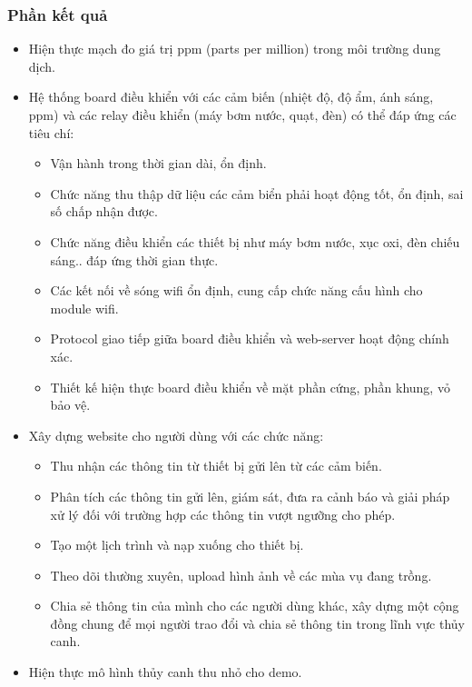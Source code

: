 \documentclass[a4paper,12pt,oneside]{article}
\begin{document}
\subsubsection{Phần kết quả}

\begin{itemize}
\item Hiện thực mạch đo giá trị ppm (parts per million) trong môi trường dung dịch.
\item Hệ thống board điều khiển với các cảm biến (nhiệt độ, độ ẩm, ánh sáng, ppm) và các relay điều khiển (máy bơm nước, quạt, đèn) có thể đáp ứng các tiêu chí:
	\begin{itemize}
		\item Vận hành trong thời gian dài, ổn định.
		\item Chức năng thu thập dữ liệu các cảm biển phải hoạt động tốt, ổn định, sai số chấp nhận được.
		\item Chức năng điều khiển các thiết bị như máy bơm nước, xục oxi, đèn chiếu sáng.. đáp ứng thời gian thực.
		\item Các kết nối về sóng wifi ổn định, cung cấp chức năng cấu hình cho module wifi.
		\item Protocol giao tiếp giữa board điều khiển và web-server hoạt động chính xác.
		\item Thiết kế hiện thực board điều khiển về mặt phần cứng, phần khung, vỏ bảo vệ.
	\end{itemize} 
\item Xây dựng website cho người dùng với các chức năng:
	\begin{itemize}
		\item Thu nhận các thông tin từ thiết bị  gửi lên từ các cảm biến.
		\item Phân tích các thông tin gửi lên, giám sát, đưa ra cảnh báo và giải pháp xử lý đối với trường hợp các thông tin vượt ngưỡng cho phép.
		\item Tạo một lịch trình và nạp xuống cho thiết bị.
		\item Theo dõi thường xuyên, upload hình ảnh về các mùa vụ đang trồng.
		\item Chia sẻ thông tin của mình cho các người dùng khác, xây dựng một cộng đồng chung để mọi người trao đổi và chia sẻ thông tin trong lĩnh vực thủy canh.
	\end{itemize}
\item Hiện thực mô hình thủy canh thu nhỏ cho demo.
\end{itemize}


\newpage
\end{document}
